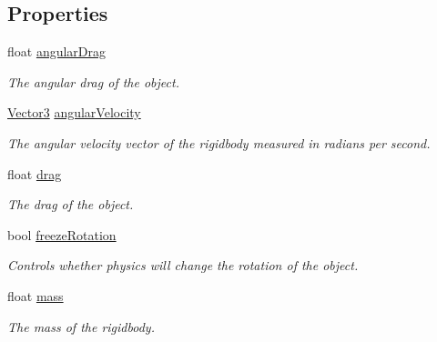 \subsection*{Properties}
\begin{DoxyCompactItemize}
\item 
float \mbox{\hyperlink{class_lua_1_1_rigidbody_a901b3213408100236b17a3e55b64e6f7}{angular\+Drag}}
\begin{DoxyCompactList}\small\item\em The angular drag of the object. \end{DoxyCompactList}\item 
\mbox{\hyperlink{class_lua_1_1_vector3}{Vector3}} \mbox{\hyperlink{class_lua_1_1_rigidbody_ab88493ae1a778194017c0e3a87c0625d}{angular\+Velocity}}
\begin{DoxyCompactList}\small\item\em The angular velocity vector of the rigidbody measured in radians per second. \end{DoxyCompactList}\item 
float \mbox{\hyperlink{class_lua_1_1_rigidbody_ac537e281d009b3e07c93f7357fa743cd}{drag}}
\begin{DoxyCompactList}\small\item\em The drag of the object. \end{DoxyCompactList}\item 
bool \mbox{\hyperlink{class_lua_1_1_rigidbody_ad3f2380221d01eedada3df4d282a37d4}{freeze\+Rotation}}
\begin{DoxyCompactList}\small\item\em Controls whether physics will change the rotation of the object. \end{DoxyCompactList}\item 
float \mbox{\hyperlink{class_lua_1_1_rigidbody_aeab0f1c55ada296d501909dd61533a35}{mass}}
\begin{DoxyCompactList}\small\item\em The mass of the rigidbody. \end{DoxyCompactList}\item 

\end{DoxyCompactItemize}
